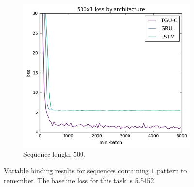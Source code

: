 \begin{figure}[tbh]
\begin{subfigure}[t]{0.3\linewidth}
	\includegraphics[width=\linewidth]{exps/vbind/plots/500x1}
	\caption{Sequence length 500.}
\end{subfigure}

\caption[Variable binding results, one pattern]
{Variable binding results for sequences containing \(1\) pattern to remember. The baseline loss for this
task is 5.5452.}
\label{fig:vbindn1}
\end{figure}

